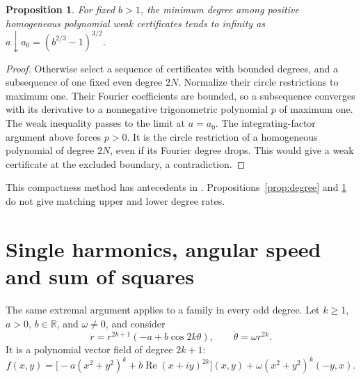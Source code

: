 \documentclass[11pt]{article}
\newtheorem{proposition}[theorem]{Proposition}
\theoremstyle{remark}\newtheorem{remark}[theorem]{Remark}
\newcommand{\R}{\mathbb R}
\newcommand{\Rea}{\operatorname{Re}}
\begin{document}
\begin{proposition}\label{prop:blowup}
For fixed \(b>1\), the minimum degree among positive homogeneous
polynomial weak certificates tends to infinity as
\(a\downarrow a_0=(b^{2/3}-1)^{3/2}\).
\end{proposition}
\begin{proof}
Otherwise select a sequence of certificates with bounded degrees,
and a subsequence of one fixed even degree \(2N\).
Normalize their circle restrictions to maximum one.
Their Fourier coefficients are bounded, so a subsequence converges
with its derivative to a nonnegative trigonometric polynomial
\(p\) of maximum one. The weak inequality passes to the limit
at \(a=a_0\). The integrating-factor argument above forces
\(p>0\). It is the circle restriction of a homogeneous polynomial
of degree \(2N\), even if its Fourier degree drops.
This would give a weak certificate at the excluded boundary,
a contradiction.
\end{proof}

This compactness method has antecedents in
\cite[Theorem 4.3]{ahmadi-parrilo}.
Propositions~\ref{prop:degree} and \ref{prop:blowup}
do not give matching upper and lower degree rates.

\section{Single harmonics, angular speed and sum of squares}
The same extremal argument applies to a family in every odd degree.
Let \(k\ge1\), \(a>0\), \(b\in\R\), and \(\omega\ne0\), and consider
\begin{equation}\label{eq:higher}
 \dot r=r^{2k+1}(-a+b\cos2k\theta),
 \qquad \dot\theta=\omega r^{2k}.
\end{equation}
It is a polynomial vector field of degree \(2k+1\):
\[
 f(x,y)=
 \bigl[-a(x^2+y^2)^k+b\Rea(x+iy)^{2k}\bigr](x,y)
       +\omega(x^2+y^2)^k(-y,x).
\]
\end{document}
